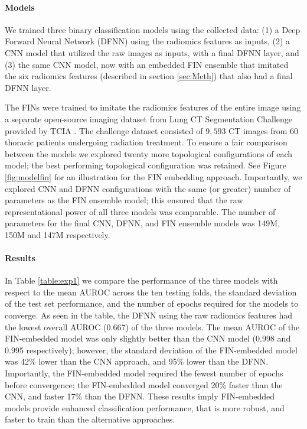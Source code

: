 \documentclass{article}
\begin{document}
\paragraph*{Models} We trained three binary classification models using the collected data: (1) a Deep Forward Neural Network (DFNN) using the radiomics features as inputs, (2) a CNN model that utilized the raw images as inputs, with a final DFNN layer, and (3) the same CNN model, now with an embedded FIN ensemble that imitated the six radiomics features (described in section \ref{sec:Meth}) that also had a final DFNN layer.


The FINs were trained to imitate the radiomics features of the entire image using a separate open-source imaging dataset from Lung CT Segmentation Challenge \cite{lungCT} provided by TCIA \cite{clark2013cancer}. The challenge dataset consisted of $9,593$ CT images from $60$ thoracic patients undergoing radiation treatment. To ensure a fair comparison between the models we explored twenty more topological configurations of each model; the best performing topological configuration was retained. See Figure \ref{fig:modelfin} for an illustration for the FIN embedding approach. Importantly, we explored CNN and DFNN configurations with the same (or greater) number of parameters as the FIN ensemble model; this ensured that the raw representational power of all three models was comparable. The number of parameters for the final CNN, DFNN, and FIN ensemble models was 149M, 150M and 147M respectively.




\paragraph*{Results}
In Table \ref{table:exp1} we compare the performance of the three models with respect to the mean AUROC across the ten testing folds, the standard deviation of the test set performance, and the number of epochs required for the models to converge. As seen in the table, the DFNN using the raw radiomics features had the lowest overall AUROC (0.667) of the three models. The mean AUROC of the FIN-embedded model was only slightly better than the CNN model (0.998 and 0.995 respectively); however, the standard deviation of the FIN-embedded model was 42\% lower than the CNN approach, and 95\% lower than the DFNN. Importantly, the FIN-embedded model required the fewest number of epochs before convergence; the FIN-embedded model converged 20\% faster than the CNN, and faster 17\% than the DFNN. These results imply FIN-embedded models provide enhanced classification performance, that is more robust, and faster to train than the alternative approaches.
\end{document}
